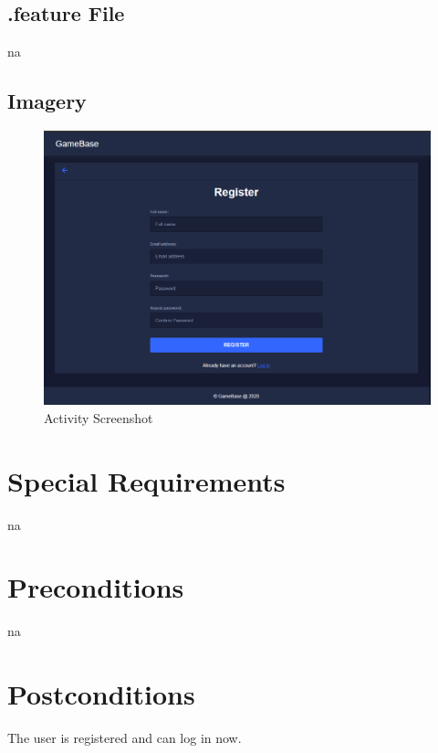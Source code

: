 \documentclass[a4paper,12pt,chapterprefix=false,bibliography=totoc,listof=totoc,book]{scrreprt}
\begin{document}
    \section{.feature File}
    \gls{na}

    \section{Imagery}
    \begin{figure}[H]
        \includegraphics[width=\textwidth]{diagramms/UCRegisterUserScreenshot.png}
        \caption{Activity Screenshot}
        \label{fig:screen}
    \end{figure}

    \chapter{Special Requirements}
    \gls{na}

    \chapter{Preconditions}
    \gls{na}

    \chapter{Postconditions}
    The user is registered and can log in now.
\end{document}
